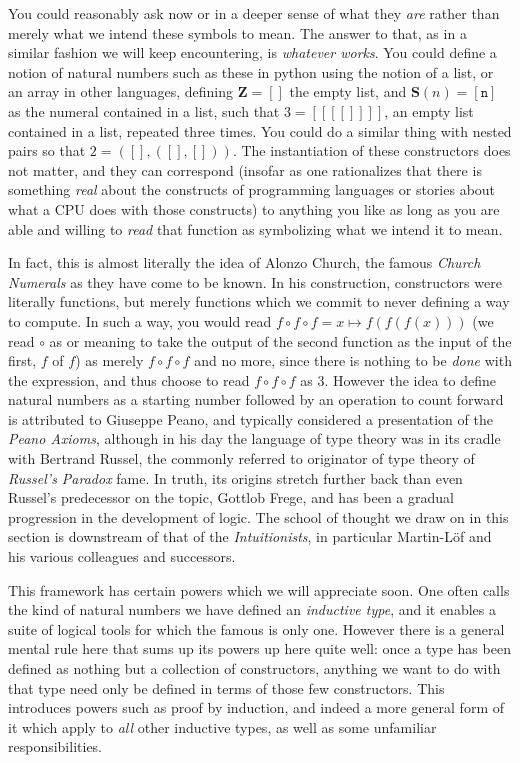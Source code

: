 \documentclass[11pt]{article}
\begin{document}
You could reasonably ask now  or  in a deeper sense of what they \emph{are} rather than merely what we intend these symbols to mean. The answer to that, as in a similar fashion we will keep encountering, is \emph{whatever works}. You could define a notion of natural numbers such as these in python using the notion of a list, or an array in other languages, defining $\mathbf{Z} = \mathtt{[]}$ the empty list, and $\mathbf{S}(n) = \mathtt{[n]}$ as the numeral contained in a list, such that $3 = \mathtt{[[[[]]]]}$, an empty list contained in a list, repeated three times. You could do a similar thing with nested pairs so that $2 = \mathtt{([],([],[]))}$. The instantiation of these constructors does not matter, and they can correspond  (insofar as one rationalizes that there is something \emph{real} about the constructs of programming languages or stories about what a CPU does with those constructs) to anything you like as long as you are able and willing to \emph{read} that function as symbolizing what we intend it to mean.

In fact, this is almost literally the idea of Alonzo Church, the famous \emph{Church Numerals} as they have come to be known. In his construction, constructors were literally functions, but merely functions which we commit to never defining a way to compute. In such a way, you would read ${f \circ f \circ f = x \mapsto f(f(f(x)))}$ (we read $\circ$ as  or  meaning to take the output of the second function as the input of the first, $f$ of $f$) as merely $f \circ f \circ f$ and no more, since there is nothing to be \emph{done} with the expression, and thus choose to read $f \circ f \circ f$ as $3$. However the idea to define natural numbers as a starting number followed by an operation to count forward is attributed to Giuseppe Peano, and typically considered a presentation of the \emph{Peano Axioms}, although in his day the language of type theory was in its cradle with Bertrand Russel, the commonly referred to originator of type theory of \emph{Russel's Paradox} fame. In truth, its origins stretch further back than even Russel's predecessor on the topic, Gottlob Frege, and has been a gradual progression in the development of logic. The school of thought we draw on in this section is downstream of that of the \emph{Intuitionists}, in particular Martin-Löf and his various colleagues and successors.

This framework has certain powers which we will appreciate soon. One often calls the kind of natural numbers we have defined an \emph{inductive type}, and it enables a suite of logical tools for which the famous  is only one. However there is a general mental rule here that sums up its powers up here quite well: once a type has been defined as nothing but a collection of constructors, anything we want to do with that type need only be defined in terms of those few constructors. This introduces powers such as proof by induction, and indeed a more general form of it which apply to \emph{all} other inductive types, as well as some unfamiliar responsibilities.
\end{document}
